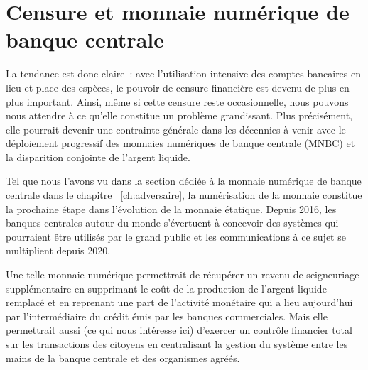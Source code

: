 
\section*{Censure et monnaie numérique de banque centrale}


La tendance est donc claire~: avec l'utilisation intensive des comptes bancaires en lieu et place des espèces, le pouvoir de censure financière est devenu de plus en plus important. Ainsi, même si cette censure reste occasionnelle, nous pouvons nous attendre à ce qu'elle constitue un problème grandissant. Plus précisément, elle pourrait devenir une contrainte générale dans les décennies à venir avec le déploiement progressif des monnaies numériques de banque centrale (MNBC) et la disparition conjointe de l'argent liquide.

Tel que nous l'avons vu dans la section dédiée à la monnaie numérique de banque centrale dans le chapitre ~\ref{ch:adversaire}, la numérisation de la monnaie constitue la prochaine étape dans l'évolution de la monnaie étatique. Depuis 2016, les banques centrales autour du monde s'évertuent à concevoir des systèmes qui pourraient être utilisés par le grand public et les communications à ce sujet se multiplient depuis 2020.

Une telle monnaie numérique permettrait de récupérer un revenu de seigneuriage supplémentaire en supprimant le coût de la production de l'argent liquide remplacé et en reprenant une part de l'activité monétaire qui a lieu aujourd'hui par l'intermédiaire du crédit émis par les banques commerciales. Mais elle permettrait aussi (ce qui nous intéresse ici) d'exercer un contrôle financier total sur les transactions des citoyens en centralisant la gestion du système entre les mains de la banque centrale et des organismes agréés.

